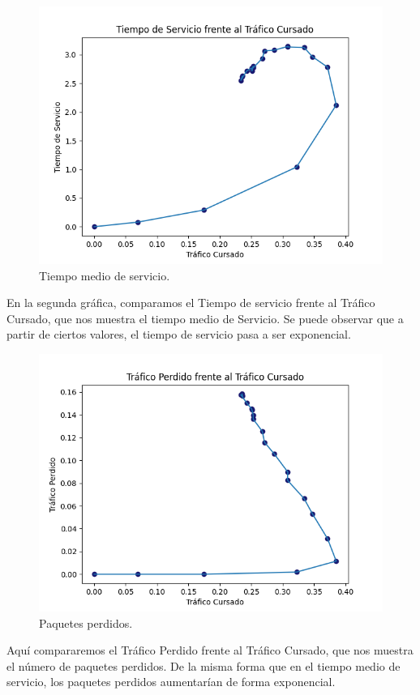 \documentclass{article}
\begin{document}
\begin{figure}[h]
    \centering
    \includegraphics[width=0.7\linewidth]{src/TSvsTC.png}
    \caption{\label{fig:TSvsTC} Tiempo medio de servicio.}
\end{figure}

En la segunda gráfica, comparamos el Tiempo de servicio frente al Tráfico Cursado, que nos muestra el tiempo medio de Servicio. Se puede observar que a partir de ciertos valores, el tiempo de servicio pasa a ser exponencial.

\newpage

\begin{figure}[h]
    \centering
    \includegraphics[width=0.7\linewidth]{src/TPvsTC.png}
    \caption{\label{fig:TPvsTC} Paquetes perdidos.}
\end{figure}

Aquí compararemos el Tráfico Perdido frente al Tráfico Cursado, que nos muestra el número de paquetes perdidos. De la misma forma que en el tiempo medio de servicio, los paquetes perdidos aumentarían de forma exponencial. 
\end{document}
